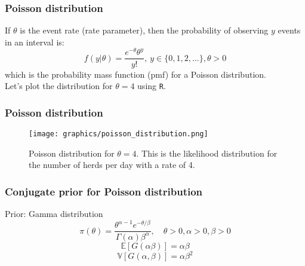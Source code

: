 \documentclass{beamer}
\newcommand{\E}{\mathbb{E}}
\newcommand{\V}{\mathbb{V}}
\newcommand{\1}{\ensuremath{\mathbf{1}}}
\begin{document}
%
%
%
\begin{frame}\frametitle{Poisson distribution}
	If $\theta$ is the event rate (rate parameter), then the probability of observing $y$ events in an interval is:
	\begin{equation}
		f(y|\theta) = \frac{e^{-\theta}\theta^y}{y!}, \: y \in \{0,1,2,\ldots\}, \theta > 0
	\end{equation}
	which is the probability mass function (pmf) for a Poisson distribution.\\[3ex]
	Let’s plot the distribution for $\theta = 4$ using \texttt{R}.
\end{frame}
%
%
%
\begin{frame}\frametitle{Poisson distribution}
	\begin{figure}
	\begin{center}
		\texttt{[image: graphics/poisson\_distribution.png]}
	\end{center}
	\caption{Poisson distribution for $\theta = 4$. This is the likelihood distribution for the number of herds per day with a rate of 4.}
	\end{figure}
\end{frame}
%
%
%
\begin{frame}\frametitle{Conjugate prior for Poisson distribution}
	Prior: Gamma distribution
	\begin{equation}
		\pi(\theta) = \frac{\theta^{\alpha-1}e^{-\theta/\beta}}{\Gamma(\alpha)\beta^\alpha}, \quad \theta >0, \alpha>0, \beta>0
	\end{equation}
	\begin{equation}
		\E[G(\alpha\beta)] = \alpha\beta
	\end{equation}
	\begin{equation}
		\V[G(\alpha,\beta)] = \alpha\beta^2
	\end{equation}
\end{frame}
%
%
%
\end{document}
